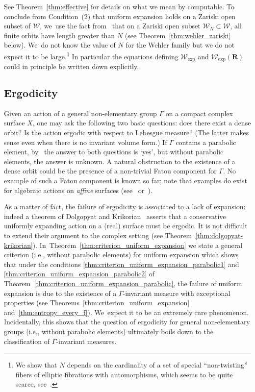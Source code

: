 \documentclass[11pt]{article}
\newcommand{\ie}{i.e.,\xspace}
\def\R{\mathbf{R}}
\newcommand{\cW}{\mathcal{W}}
\theoremstyle{plain}
\theoremstyle{definition}
\numberwithin{equation}{section}
\begin{document}
See Theorem~\ref{thm:effective} for details on what we mean by computable. To conclude
from Condition~(2) that uniform
expansion holds on a Zariski open subset of $\mathcal W$, we~use the fact from~\cite{finite_orbits}
that on a Zariski open subset $\mathcal W_N\subset \mathcal W$, all finite orbits have length
greater than $N$ (see Theorem~\ref{thm:wehler_zariski} below). We~do not know the value of $N$ for the Wehler family but we do not expect it to be large.\footnote{We show that $N$ depends on the cardinality of a set of special ``non-twisting'' fibers of elliptic fibrations with automorphisms, which seems to be quite scarce, see~\cite[Rem.\,7.7.14]{duistermaat}.}
In particular the equations defining $ \cW_{\mathrm{exp}}$ and $ \cW_{\mathrm{exp}}(\R)$
could in principle be written down explicitly.

\subsection{Ergodicity} \label{subs:intro_ergodicity}
Given an action of a general non-elementary group $\Gamma$ on a compact complex surface $X$,
one may ask the following two basic questions:
does there exist a dense orbit? Is the action ergodic with respect to Lebesgue measure?
(The latter makes sense even when there is no invariant volume form.)
If $\Gamma$ contains a parabolic element, by~\cite{invariant} the answer to both questions is `yes',
but without parabolic elements, the answer is unknown.
A natural obstruction to the existence of
a dense orbit could be the presence of a non-trivial Fatou
component for $\Gamma$. No example of such a Fatou component is known so far;
note that examples do exist for algebraic actions on \emph{affine} surfaces
(see~\cite[\S 4.1]{Cantat:BHPS} or~\cite[Th.\,E]{rebelo-roeder}).

As a matter of fact, the failure of ergodicity is
associated to a lack of expansion: indeed a
theorem of Dolgopyat and Krikorian~\cite[\S 10]{dolgopyat-krikorian}
asserts that a conservative uniformly expanding action on a (real) surface must be ergodic. It is not difficult
to extend their argument to the complex setting (see Theorem~\ref{thm:dolgopyat-krikorian}). In~Theorem~\ref{thm:criterion_uniform_expansion} we state
a general criterion (\ie without parabolic elements) for uniform expansion
which shows that under the conditions \eqref{thm:criterion_uniform_expansion_parabolic1} and \eqref{thm:criterion_uniform_expansion_parabolic2} of
Theorem~\ref{thm:criterion_uniform_expansion_parabolic},
the failure of uniform expansion is due to the existence of a
$\Gamma$-invariant measure with exceptional properties (see Theorems~\ref{thm:criterion_uniform_expansion} and~\ref{thm:entropy_every_f}). We~expect it to be an extremely rare phenomenon.
Incidentally,
this shows that the question of ergodicity for general non-elementary groups (\ie without parabolic elements)
ultimately boils down to the
classification of $\Gamma$-invariant measures.
\end{document}
